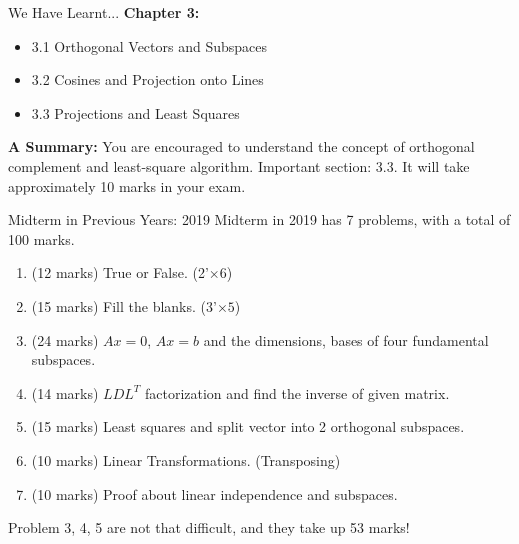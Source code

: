 \documentclass{beamer}
\begin{document}
\begin{frame}{We Have Learnt...}
\textbf{Chapter 3:}
\begin{itemize}
    \item 3.1 Orthogonal Vectors and Subspaces
    \item 3.2 Cosines and Projection onto Lines
    \item 3.3 Projections and Least Squares
\end{itemize}

\vspace{5pt}
\textbf{A Summary:} You are encouraged to understand the concept of orthogonal complement and least-square algorithm. Important section: 3.3. It will take approximately 10 marks in your exam.

\end{frame}

\begin{frame}{Midterm in Previous Years: 2019}
Midterm in 2019 has 7 problems, with a total of 100 marks.
\begin{enumerate}
    \item (12 marks) True or False. (2'$\times 6$)
    \item (15 marks) Fill the blanks. (3'$\times 5$)
    \item (24 marks) $Ax=0$, $Ax=b$ and the dimensions, bases of four fundamental subspaces.
    \item (14 marks) $LDL^T$ factorization and find the inverse of given matrix.
    \item (15 marks) Least squares and split vector into 2 orthogonal subspaces.
    \item (10 marks) Linear Transformations. (Transposing)
    \item (10 marks) Proof about linear independence and subspaces.
\end{enumerate}

\vspace{3pt}
Problem 3, 4, 5 are not that difficult, and they take up 53 marks!
\end{frame}
\end{document}

